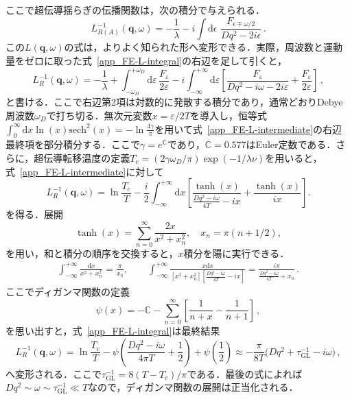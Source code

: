 \documentclass[a4paper,11pt]{ltjsarticle}
\def\d{\mathrm{d}}
\begin{document}
ここで超伝導揺らぎの伝播関数は，次の積分で与えられる．
\begin{equation}\label{app_FE-L-integral}
L^{-1}_{R(A)}(\mathbf{q},\omega)=-\frac{1}{\lambda}-i\int\d\epsilon
\,\, \frac{F_{\epsilon\mp\omega/2}}{Dq^{2}-2i\epsilon}\,.
\end{equation}
この$L(\mathbf{q},\omega)$の式は，よりよく知られた形へ変形できる．実際，周波数と運動量をゼロに取った式~\eqref{app_FE-L-integral}の右辺を足して引くと，
\begin{equation}\label{app_FE-L-intermediate}
L^{-1}_{R}(\mathbf{q},\omega)=-\frac{1}{\lambda}+\int^{+\omega_{D}}_{-\omega_{D}}
\mathrm{d}\varepsilon\,\frac{F_{\varepsilon}}{2\varepsilon}-
i\int^{+\infty}_{-\infty}\mathrm{d}\varepsilon\left[
\frac{F_{\varepsilon}}{Dq^{2}-i\omega-2i\varepsilon}+
\frac{F_{\varepsilon}}{2\varepsilon}\right]\,,
\end{equation}
と書ける．ここで右辺第2項は対数的に発散する積分であり，通常どおりDebye周波数$\omega_{D}$で打ち切る．無次元変数$x=\varepsilon/2T$を導入し，恒等式$\int^{\infty}_{0}\mathrm{d}x\ln(x)
\mathrm{sech}^{2}(x)=-\ln\frac{4\gamma}{\pi}$を用いて式~\eqref{app_FE-L-intermediate}の右辺最終項を部分積分する．ここで$\gamma=e^{\mathbb{C}}$であり，$\mathbb{C}=0.577$はEuler定数である．さらに，超伝導転移温度の定義$T_{c}=(2\gamma\omega_{D}/\pi)\exp(-1/\lambda\nu)$を用いると，式~\eqref{app_FE-L-intermediate}に対して
\begin{equation}
L^{-1}_{R}(\mathbf{q},\omega)=\ln\frac{T_{c}}{T}-\frac{i}{2}
\int^{+\infty}_{-\infty}\mathrm{d}x
\left[\frac{\tanh(x)}{\frac{Dq^{2}
-i\omega}{4T}-ix}+\frac{\tanh(x)}{ix}\right].
\end{equation}
を得る．展開
\begin{equation}\label{tanh-series}
\tanh(x)=\sum^{\infty}_{n=0}\frac{2x}{x^{2}+x^{2}_{n}},\quad
x_{n}=\pi(n+1/2),
\end{equation}
を用い，和と積分の順序を交換すると，$x$積分を陽に実行できる．
\begin{eqnarray}
\int^{+\infty}_{-\infty}\frac{\mathrm{d}x}{x^{2}+x^{2}_{n}}=
\frac{\pi}{x_{n}},\quad\quad
\int^{+\infty}_{-\infty}\frac{x\mathrm{d}x}{\left[x^{2}+x^{2}_{n}\right]
\left[\frac{Dq^{2}-i\omega}{4T}-ix\right]}=\frac{i\pi}
{\frac{Dq^{2}-i\omega}{4T}+x_{n}}\,.
\end{eqnarray}
ここでディガンマ関数の定義
\begin{equation}
\psi(x)=-\mathbb{C}-\sum^{\infty}_{n=0}\left[\frac{1}{n+x}-
\frac{1}{n+1}\right]\,,
\end{equation}
を思い出すと，式~\eqref{app_FE-L-integral}は最終結果
\begin{equation}\label{app_FE-L-R}
L^{-1}_{R}(\mathbf{q},\omega)=\ln\frac{T_{c}}{T}-\psi\left(
\frac{Dq^{2}-i\omega}{4\pi T}+\frac{1}{2}\right)+
\psi\left(\frac{1}{2}\right)\approx-\frac{\pi}{8T}
\Big(Dq^2+\tau^{-1}_{\mathrm{GL}}-i\omega\Big)\,,
\end{equation}
へ変形される．ここで$\tau_{\mathrm{GL}}^{-1}=8(T-T_c)/\pi$である．最後の式によれば$Dq^2\sim \omega\sim \tau_{\mathrm{GL}}^{-1}\ll T$なので，ディガンマ関数の展開は正当化される．
\end{document}
